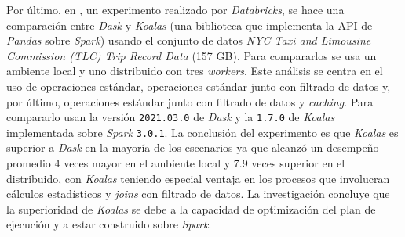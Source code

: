 Por último, en \cite{koalas-dask}, un experimento realizado por \textit{Databricks}, se hace una comparación entre \textit{Dask} y \textit{Koalas} (una biblioteca que implementa la API de \textit{Pandas} sobre \textit{Spark}) usando el conjunto de datos \textit{NYC Taxi and Limousine Commission (TLC) Trip Record Data} (157 GB). Para compararlos se usa un ambiente local y uno distribuido con tres \textit{workers}. Este análisis se centra en el uso de operaciones estándar, operaciones estándar junto con filtrado de datos y, por último, operaciones estándar junto con filtrado de datos y \textit{caching}. Para compararlo usan la versión \texttt{2021.03.0} de \textit{Dask} y la \texttt{1.7.0} de \textit{Koalas} implementada sobre \textit{Spark} \texttt{3.0.1}. La conclusión del experimento es que \textit{Koalas} es superior a \textit{Dask} en la mayoría de los escenarios ya que alcanzó un desempeño promedio 4 veces mayor en el ambiente local y 7.9 veces superior en el distribuido, con \textit{Koalas} teniendo especial ventaja en los procesos que involucran cálculos estadísticos y \textit{joins} con filtrado de datos. La investigación concluye que la superioridad de \textit{Koalas} se debe a la capacidad de optimización del plan de ejecución y a estar construido sobre \textit{Spark}.

\newpage

